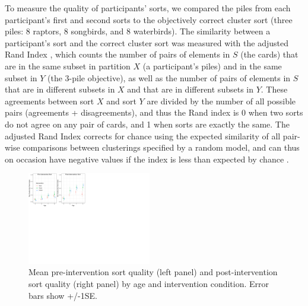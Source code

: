 \documentclass[10pt,letterpaper]{article}
\begin{document}
To measure the quality of participants' sorts, we compared the piles from each participant's first and second sorts to the objectively correct cluster sort (three piles: 8 raptors, 8 songbirds, and 8 waterbirds). 
The similarity between a participant's sort and the correct cluster sort was measured with the adjusted Rand Index \cite{Rand:1971}, which counts the number of pairs of elements in $S$ (the cards) that are in the same subset in partition $X$ (a participant's piles) and in the same subset in $Y$ (the 3-pile objective), as well as the number of pairs of elements in $S$ that are in different subsets in $X$ and that are in different subsets in $Y$.
These agreements between sort $X$ and sort $Y$ are divided by the number of all possible pairs (agreements + disagreements), and thus the Rand index is 0 when two sorts do not agree on any pair of cards, and 1 when sorts are exactly the same.
The adjusted Rand Index corrects for chance using the expected similarity of all pair-wise comparisons between clusterings specified by a random model, and can thus on occasion have negative values if the index is less than expected by chance \cite{Hubert:1985}.

\begin{figure}[h]
  \centering
  \includegraphics[width=0.48\textwidth]{figures/sort1_sort2_combined}
  \caption{Mean pre-intervention sort quality (left panel) and post-intervention sort quality (right panel) by age and intervention condition. Error bars show +/-1SE.}
  \label{fig:sort-quality}
\end{figure} 
\end{document}
